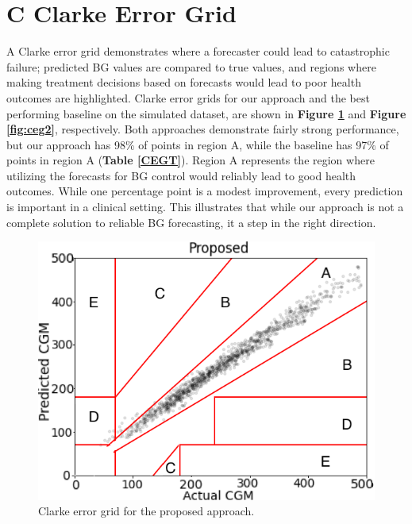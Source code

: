 \documentclass[letterpaper]{article}
\begin{document}
\begin{table}[htbp]
  \centering 
  



\hspace*{-.5cm}
\caption{Proportion of points in each region of the Clarke Error Grid. Region A represents strong forecasts, while regions C through E represent potentially catastrophic errors}\label{CEGT}
  \label{syn1} \label{CEGT}
\end{table}




\section{C Clarke Error Grid}

A Clarke error grid demonstrates where a forecaster could lead to catastrophic failure; predicted BG values are compared to true values, and regions where making treatment decisions based on forecasts would lead to poor health outcomes are highlighted. Clarke error grids for our approach and the best performing baseline on the simulated dataset, are shown in \textbf{Figure \ref{fig:ceg1}} and \textbf{Figure \ref{fig:ceg2}}, respectively. Both approaches demonstrate fairly strong performance, but our approach has 98\% of points in region A, while the baseline has 97\% of points in region A (\textbf{Table \ref{CEGT}}). Region A represents the region where utilizing the forecasts for BG control would reliably lead to good health outcomes. While one percentage point is a modest improvement, every prediction is important in a clinical setting. This illustrates that while our approach is not a complete solution to reliable BG forecasting, it a step in the right direction.


\begin{figure}[t]
 \centering 
 \hspace*{-.1cm} \includegraphics[height=2.3 in]{ours.png}
\caption{ Clarke error grid for the proposed approach.}\label{fig:ceg1}
\end{figure}
\end{document}
